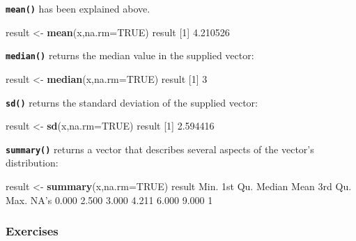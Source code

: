 \documentclass[]{book}
\newenvironment{Shaded}{\begin{snugshade}}{\end{snugshade}}
\newcommand{\DataTypeTok}[1]{\textcolor[rgb]{0.13,0.29,0.53}{#1}}
\newcommand{\DecValTok}[1]{\textcolor[rgb]{0.00,0.00,0.81}{#1}}
\newcommand{\FloatTok}[1]{\textcolor[rgb]{0.00,0.00,0.81}{#1}}
\newcommand{\KeywordTok}[1]{\textcolor[rgb]{0.13,0.29,0.53}{\textbf{#1}}}
\newcommand{\NormalTok}[1]{#1}
\newcommand{\OtherTok}[1]{\textcolor[rgb]{0.56,0.35,0.01}{#1}}
\newcommand{\StringTok}[1]{\textcolor[rgb]{0.31,0.60,0.02}{#1}}
\begin{document}
\textbf{\texttt{mean()}} has been explained above.

\begin{Shaded}
\begin{Highlighting}[]
\NormalTok{result <-}\StringTok{ }\KeywordTok{mean}\NormalTok{(x,}\DataTypeTok{na.rm=}\OtherTok{TRUE}\NormalTok{)}
\NormalTok{result}
\NormalTok{[}\DecValTok{1}\NormalTok{] }\FloatTok{4.210526}
\end{Highlighting}
\end{Shaded}

\textbf{\texttt{median()}} returns the median value in the supplied vector:

\begin{Shaded}
\begin{Highlighting}[]
\NormalTok{result <-}\StringTok{ }\KeywordTok{median}\NormalTok{(x,}\DataTypeTok{na.rm=}\OtherTok{TRUE}\NormalTok{)}
\NormalTok{result}
\NormalTok{[}\DecValTok{1}\NormalTok{] }\DecValTok{3}
\end{Highlighting}
\end{Shaded}

\textbf{\texttt{sd()}} returns the standard deviation of the supplied vector:

\begin{Shaded}
\begin{Highlighting}[]
\NormalTok{result <-}\StringTok{ }\KeywordTok{sd}\NormalTok{(x,}\DataTypeTok{na.rm=}\OtherTok{TRUE}\NormalTok{)}
\NormalTok{result}
\NormalTok{[}\DecValTok{1}\NormalTok{] }\FloatTok{2.594416}
\end{Highlighting}
\end{Shaded}

\textbf{\texttt{summary()}} returns a vector that describes several aspects of the vector's distribution:

\begin{Shaded}
\begin{Highlighting}[]
\NormalTok{result <-}\StringTok{ }\KeywordTok{summary}\NormalTok{(x,}\DataTypeTok{na.rm=}\OtherTok{TRUE}\NormalTok{)}
\NormalTok{result}
\NormalTok{   Min. 1st Qu.  Median    Mean 3rd Qu.    Max.    NA}\StringTok{'s }
\StringTok{  0.000   2.500   3.000   4.211   6.000   9.000       1 }
\end{Highlighting}
\end{Shaded}

\hypertarget{exercises-4}{%
\subsubsection*{Exercises}\label{exercises-4}}
\end{document}
